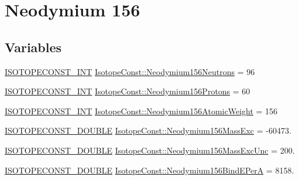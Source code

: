 \hypertarget{group___isotope_const-_neodymium-_nd156}{}\section{Neodymium 156}
\label{group___isotope_const-_neodymium-_nd156}
\subsection*{Variables}
\begin{DoxyCompactItemize}
\item 
\mbox{\hyperlink{group___isotope_const-_macros_ga5f18360b3e99483a35c32d789e62621c}{I\+S\+O\+T\+O\+P\+E\+C\+O\+N\+S\+T\+\_\+\+I\+NT}} \mbox{\hyperlink{group___isotope_const-_neodymium-_nd156_gaa08e165997c514ef4403a74dc86b999c}{Isotope\+Const\+::\+Neodymium156\+Neutrons}} = 96
\item 
\mbox{\hyperlink{group___isotope_const-_macros_ga5f18360b3e99483a35c32d789e62621c}{I\+S\+O\+T\+O\+P\+E\+C\+O\+N\+S\+T\+\_\+\+I\+NT}} \mbox{\hyperlink{group___isotope_const-_neodymium-_nd156_ga08f1021bbfd00d28d6cbfc27c972a655}{Isotope\+Const\+::\+Neodymium156\+Protons}} = 60
\item 
\mbox{\hyperlink{group___isotope_const-_macros_ga5f18360b3e99483a35c32d789e62621c}{I\+S\+O\+T\+O\+P\+E\+C\+O\+N\+S\+T\+\_\+\+I\+NT}} \mbox{\hyperlink{group___isotope_const-_neodymium-_nd156_ga02e4ee1a4fe7282c0a95c87e5fc872fa}{Isotope\+Const\+::\+Neodymium156\+Atomic\+Weight}} = 156
\item 
\mbox{\hyperlink{group___isotope_const-_macros_ga8f45a7272ce02c0b4c65c44636ed719a}{I\+S\+O\+T\+O\+P\+E\+C\+O\+N\+S\+T\+\_\+\+D\+O\+U\+B\+LE}} \mbox{\hyperlink{group___isotope_const-_neodymium-_nd156_ga262cb58e1ba4e6573d21969db9212f2f}{Isotope\+Const\+::\+Neodymium156\+Mass\+Exc}} = -\/60473.
\item 
\mbox{\hyperlink{group___isotope_const-_macros_ga8f45a7272ce02c0b4c65c44636ed719a}{I\+S\+O\+T\+O\+P\+E\+C\+O\+N\+S\+T\+\_\+\+D\+O\+U\+B\+LE}} \mbox{\hyperlink{group___isotope_const-_neodymium-_nd156_gaec2de5279ee342267ba7674ed91ed8c7}{Isotope\+Const\+::\+Neodymium156\+Mass\+Exc\+Unc}} = 200.
\item 
\mbox{\hyperlink{group___isotope_const-_macros_ga8f45a7272ce02c0b4c65c44636ed719a}{I\+S\+O\+T\+O\+P\+E\+C\+O\+N\+S\+T\+\_\+\+D\+O\+U\+B\+LE}} \mbox{\hyperlink{group___isotope_const-_neodymium-_nd156_gaa8d5d1fab9398e5e3eaa76a9e3233d39}{Isotope\+Const\+::\+Neodymium156\+Bind\+E\+PerA}} = 8158.
\item 

\end{DoxyCompactItemize}
